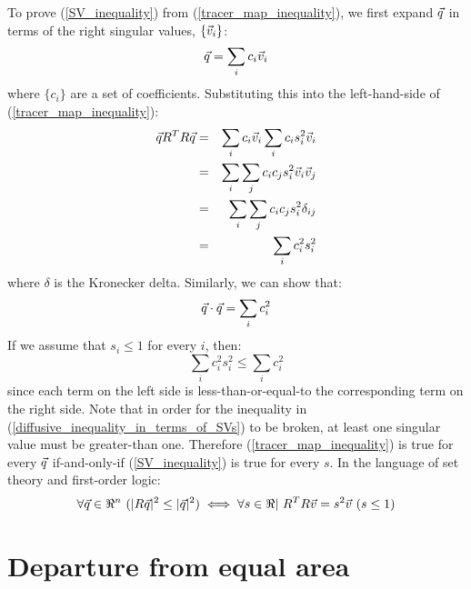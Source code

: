 To prove (\ref{SV_inequality}) from (\ref{tracer_map_inequality}), we first
expand $\vec q$ in terms of the right singular values, 
$\lbrace \vec v_i \rbrace$:
\begin{equation}
	\vec q = \sum_i c_i \vec v_i
\end{equation}
where $\lbrace c_i \rbrace$ are a set of coefficients.
Substituting this into the left-hand-side of (\ref{tracer_map_inequality}):
\begin{eqnarray}
	\vec q R^T R \vec q & = & \sum_i c_i \vec v_i \sum_i c_i s_i^2 \vec v_i \\
   & = & \sum_i \sum_j c_i c_j s_i^2 \vec v_i \vec v_j \\
   & = & \sum_i \sum_j c_i c_j s_i^2 \delta_{ij} \\
	  & = & \sum_i c_i^2 s_i^2
\end{eqnarray}
where $\delta$ is the Kronecker delta.
Similarly, we can show that:
\begin{equation}
	\vec q \cdot \vec q = \sum_i c_i^2
\end{equation}
If we assume that $s_i \le 1$ for every $i$, then:
\begin{equation}
	\sum_i c_i^2 s_i^2 \le \sum_i c_i^2 
	\label{diffusive_inequality_in_terms_of_SVs}
\end{equation}
since each term on the left side is less-than-or-equal-to the
corresponding term on the right side. 
Note that in order for the inequality in 
(\ref{diffusive_inequality_in_terms_of_SVs}) to be broken, at least one
singular value must be greater-than one.
Therefore (\ref{tracer_map_inequality}) is true for every $\vec q$
if-and-only-if (\ref{SV_inequality}) is true for every $s$.
In the language of set theory and first-order logic:
\begin{equation}
	\forall \vec q \in \Re^n ~ (| R \vec q |^2 \le |\vec q |^2) \iff \forall s \in \Re | ~R^T R \vec v = s^2 \vec v ~ (s \le 1)
	\label{theorem}
\end{equation}

\section{Departure from equal area}

\label{equal_area}


